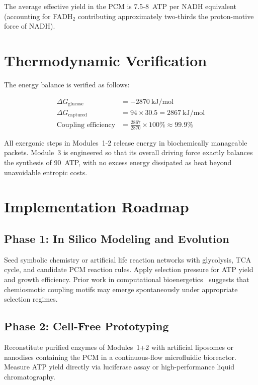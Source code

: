 \documentclass[12pt]{article}
\begin{document}
The average effective yield in the PCM is 7.5-8~ATP per NADH equivalent (accounting for FADH$_2$ contributing approximately two-thirds the proton-motive force of NADH).

\section{Thermodynamic Verification}

The energy balance is verified as follows:

\begin{align}
\Delta G_{\text{glucose}} &= -2870\ \text{kJ/mol} \nonumber \\
\Delta G_{\text{captured}} &= 94 \times 30.5 = 2867\ \text{kJ/mol} \nonumber \\
\text{Coupling efficiency} &= \frac{2867}{2870} \times 100\% \approx 99.9\%
\label{eq:energy_balance}
\end{align}

All exergonic steps in Modules~1-2 release energy in biochemically manageable packets. Module~3 is engineered so that its overall driving force exactly balances the synthesis of 90~ATP, with no excess energy dissipated as heat beyond unavoidable entropic costs.

\section{Implementation Roadmap}

\subsection{Phase 1: In Silico Modeling and Evolution}

Seed symbolic chemistry or artificial life reaction networks with glycolysis, TCA cycle, and candidate PCM reaction rules. Apply selection pressure for ATP yield and growth efficiency. Prior work in computational bioenergetics~\cite{nath2012bioenergetics,silver2013artificial} suggests that chemiosmotic coupling motifs may emerge spontaneously under appropriate selection regimes.

\subsection{Phase 2: Cell-Free Prototyping}

Reconstitute purified enzymes of Modules~1+2 with artificial liposomes or nanodiscs containing the PCM in a continuous-flow microfluidic bioreactor. Measure ATP yield directly via luciferase assay or high-performance liquid chromatography.
\end{document}
